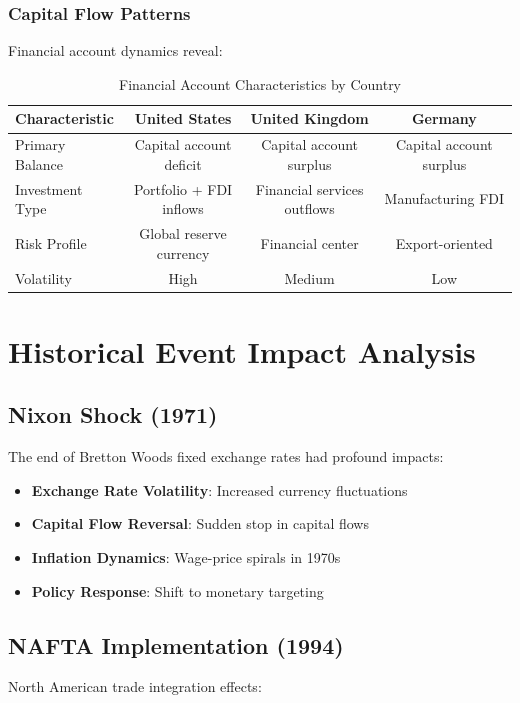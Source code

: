 \documentclass[11pt,a4paper]{article}
\begin{document}
\subsubsection{Capital Flow Patterns}
Financial account dynamics reveal:

\begin{table}[h]
\centering
\caption{Financial Account Characteristics by Country}
\begin{tabular}{lccc}
\toprule
\textbf{Characteristic} & \textbf{United States} & \textbf{United Kingdom} & \textbf{Germany} \\
\midrule
Primary Balance & Capital account deficit & Capital account surplus & Capital account surplus \\
Investment Type & Portfolio + FDI inflows & Financial services outflows & Manufacturing FDI \\
Risk Profile & Global reserve currency & Financial center & Export-oriented \\
Volatility & High & Medium & Low \\
\bottomrule
\end{tabular}
\end{table}

\section{Historical Event Impact Analysis}

\subsection{Nixon Shock (1971)}
The end of Bretton Woods fixed exchange rates had profound impacts:

\begin{itemize}
    \item \textbf{Exchange Rate Volatility}: Increased currency fluctuations
    \item \textbf{Capital Flow Reversal}: Sudden stop in capital flows
    \item \textbf{Inflation Dynamics}: Wage-price spirals in 1970s
    \item \textbf{Policy Response}: Shift to monetary targeting
\end{itemize}

\subsection{NAFTA Implementation (1994)}
North American trade integration effects:
\end{document}
